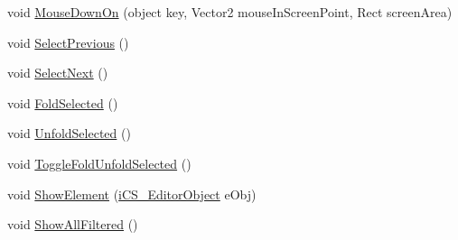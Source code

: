 \begin{DoxyCompactItemize}
\item 
void \hyperlink{classi_c_s___tree_view_controller_a2ffb851cad897ba52ed1a672919a109d}{Mouse\+Down\+On} (object key, Vector2 mouse\+In\+Screen\+Point, Rect screen\+Area)
\item 
void \hyperlink{classi_c_s___tree_view_controller_ac903e5111546ccff0d38edcf487ce519}{Select\+Previous} ()
\item 
void \hyperlink{classi_c_s___tree_view_controller_aaf1659b5bc16fe3665cc9022d4bc4130}{Select\+Next} ()
\item 
void \hyperlink{classi_c_s___tree_view_controller_a7ee9287b73a0ad90282bcebb995e889b}{Fold\+Selected} ()
\item 
void \hyperlink{classi_c_s___tree_view_controller_a64e13b79266884240bf22b00e0be105c}{Unfold\+Selected} ()
\item 
void \hyperlink{classi_c_s___tree_view_controller_afad98b50bb99215588e13e363a9f8c3d}{Toggle\+Fold\+Unfold\+Selected} ()
\item 
void \hyperlink{classi_c_s___tree_view_controller_a85f8a091a18ab8f62bc7641c4cee7f28}{Show\+Element} (\hyperlink{classi_c_s___editor_object}{i\+C\+S\+\_\+\+Editor\+Object} e\+Obj)
\item 
void \hyperlink{classi_c_s___tree_view_controller_a15a41de68c09218ac433d71a4842f3f1}{Show\+All\+Filtered} ()
\end{DoxyCompactItemize}
